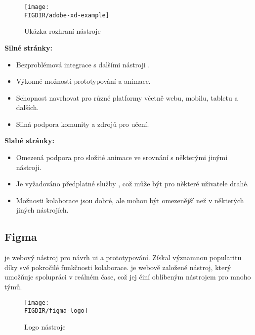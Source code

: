 \begin{figure}[H]
    \centering
    \texttt{[image: \\FIGDIR/adobe-xd-example]}
    \caption{Ukázka rozhraní nástroje \cite{adobe-xd}}
    \label{fig:adobe-xd-example}
\end{figure}

\textbf{Silné stránky:}
\begin{itemize}
    \item Bezproblémová integrace s dalšími nástroji .
    \item Výkonné možnosti prototypování a animace.
    \item Schopnost navrhovat pro různé platformy včetně webu, mobilu, tabletu a dalších.
    \item Silná podpora komunity a zdrojů pro učení.
\end{itemize}

\textbf{Slabé stránky:}
\begin{itemize}
    \item Omezená podpora pro složité animace ve srovnání s některými jinými nástroji.
    \item Je vyžadováno předplatné služby , což může být pro některé uživatele drahé.
    \item Možnosti kolaborace jsou dobré, ale mohou být omezenější než v některých jiných nástrojích.
\end{itemize}


\subsection{Figma}
\label{subsec:navrh-ui-nastroje-figma}
 je webový nástroj pro návrh \ac{ui} a prototypování.
Získal významnou popularitu díky své pokročilé funkčnosti kolaborace.
 je webově založené nástroj, který umožňuje spolupráci v reálném čase, což jej činí oblíbeným nástrojem pro mnoho týmů.

\begin{figure}[H]
    \centering
    \texttt{[image: \\FIGDIR/figma-logo]}
    \caption{Logo nástroje \cite{figma}}
    \label{fig:figma-logo}
\end{figure}

